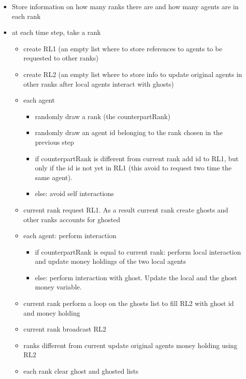 \documentclass{article}
\providecommand{\tightlist}{%
  \setlength{\itemsep}{0pt}\setlength{\parskip}{0pt}}
\begin{document}
\begin{itemize}
\tightlist
\item
  Store information on how many ranks there are and how many agents are
  in each rank
\item
	at each time step, take a rank

  \begin{itemize}
  \tightlist
  \item
    create RL1 (an empty list where to store references to agents to be requested to
    other ranks)
  \item
    create RL2 (an empty list where to store info to update original agents in other ranks after local agents interact with ghosts)
  \item
    each agent

    \begin{itemize}
    \tightlist
    \item
	    randomly draw a rank (the counterpartRank)
    \item
      randomly draw an agent id belonging to the rank chosen in the
      previous step
    \item
      if counterpartRank is different from current rank add id to RL1, but only if
      the id is not yet in RL1 (this avoid to request two time the same agent). 
    \item else: avoid self interactions
    \end{itemize}
  \item
    current rank request RL1. As a result current rank create ghosts and
    other ranks accounts for ghosted
  \item
	  each agent: perform interaction
	  \begin{itemize}
		  \item if counterpartRank is equal to current rank: perform local interaction and update money holdings of the two local agents
		  \item else: perform interaction with ghost. Update the local and the ghost money variable.
	  \end{itemize}
	\item current rank perform a loop on the ghosts list to fill RL2 with ghost id and money holding
	\item current rank broadcast RL2 
	\item ranks different from current update original agents money holding using RL2
	\item each rank clear ghost and ghosted lists

  \end{itemize}
\end{itemize}
\end{document}
